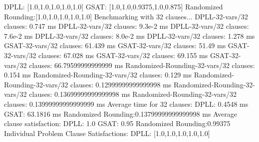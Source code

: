 \documentclass{article}
\begin{document}
  DPLL:               [1.0,1.0,1.0,1.0,1.0]\newline
  GSAT:               [1.0,1.0,0.9375,1.0,0.875]\newline
  Randomized Rounding:[1.0,1.0,1.0,1.0,1.0]\newline
\newline
\newline
Benchmarking with 32 clauses...\newline
DPLL-32-vars/32 clauses: 0.747 ms\newline
DPLL-32-vars/32 clauses: 9.3e-2 ms\newline
DPLL-32-vars/32 clauses: 7.6e-2 ms\newline
DPLL-32-vars/32 clauses: 8.0e-2 ms\newline
DPLL-32-vars/32 clauses: 1.278 ms\newline
GSAT-32-vars/32 clauses: 61.439 ms\newline
GSAT-32-vars/32 clauses: 51.49 ms\newline
GSAT-32-vars/32 clauses: 67.028 ms\newline
GSAT-32-vars/32 clauses: 69.155 ms\newline
GSAT-32-vars/32 clauses: 66.79599999999999 ms\newline
Randomized-Rounding-32-vars/32 clauses: 0.154 ms\newline
Randomized-Rounding-32-vars/32 clauses: 0.129 ms\newline
Randomized-Rounding-32-vars/32 clauses: 0.12999999999999998 ms\newline
Randomized-Rounding-32-vars/32 clauses: 0.13699999999999998 ms\newline
Randomized-Rounding-32-vars/32 clauses: 0.13999999999999999 ms\newline
Average time for 32 clauses:\newline
  DPLL:               0.4548 ms\newline
  GSAT:               63.1816 ms\newline
  Randomized Rounding:0.13799999999999998 ms\newline
Average clause satisfaction:\newline
  DPLL:               1.0\newline
  GSAT:               0.95\newline
  Randomized Rounding:0.99375\newline
\newline
Individual Problem Clause Satisfactions:\newline
  DPLL:               [1.0,1.0,1.0,1.0,1.0]\newline
\end{document}
